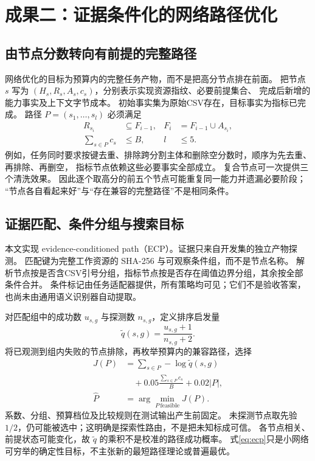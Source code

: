 \section{成果二：证据条件化的网络路径优化}
\label{sec:network-method}
\subsection{由节点分数转向有前提的完整路径}
网络优化的目标为预算内的完整任务产物，而不是把高分节点排在前面。
把节点 $s$ 写为 $(H_s,R_s,A_s,c_s)$，分别表示实现资源指纹、必要前提集合、
完成后新增的能力事实及上下文字节成本。
初始事实集为原始CSV存在，目标事实为指标已完成。
路径 $P=(s_1,\ldots,s_l)$ 必须满足
\begin{align}
R_{s_i}&\subseteq F_{i-1},&F_i&=F_{i-1}\cup A_{s_i},\\
\sum_{s\in P}c_s&\leq B,&l&\leq5.
\end{align}
例如，任务同时要求按键去重、排除跨分割主体和删除空分数时，顺序为先去重、再排除、再删空，
指标节点依赖这些必要事实全部成立。
复合节点可一次提供三个清洗效果。
因此逐个取高分的前五个节点可能重复同一能力并遗漏必要阶段；
“节点各自看起来好”与“存在兼容的完整路径”不是相同条件。

\subsection{证据匹配、条件分组与搜索目标}
本文实现 evidence-conditioned path（ECP）。证据只来自开发集的独立产物探测。
匹配键为完整工作资源的 SHA-256 与可观察条件组，而不是节点名称。
解析节点按是否含CSV引号分组，指标节点按是否存在阈值边界分组，其余按全部条件合并。
条件标记由任务适配器提供，所有策略均可见；它们不是验收答案，也尚未由通用语义识别器自动提取。

对匹配组中的成功数 $u_{s,g}$ 与探测数 $n_{s,g}$，定义排序启发量
\begin{equation}
\widetilde q(s,g)=\frac{u_{s,g}+1}{n_{s,g}+2}.
\end{equation}
将已观测到组内失败的节点排除，再枚举预算内的兼容路径，选择
\begin{equation}
\begin{aligned}
J(P)&=\sum_{s\in P}-\log\widetilde q(s,g)\\
&\quad+0.05\frac{\sum_{s\in P}c_s}{B}+0.02|P|,\\
\widehat P&=\arg\min_{P\ \mathrm{feasible}}J(P).
\end{aligned}
\label{eq:ecp}
\end{equation}
系数、分组、预算档位及比较规则在测试输出产生前固定。
未探测节点取先验 $1/2$，仍可能被选中；这明确是探索性路由，不是把未知标成可信。
各节点相关、前提状态可能变化，故 $\widetilde q$ 的乘积不是校准的路径成功概率。
式\ref{eq:ecp}只是小网络可穷举的确定性目标，不主张新的最短路径理论或普遍最优。

